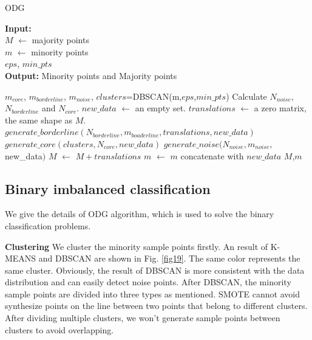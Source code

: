 \documentclass[ida]{iosart2x}
\begin{document}
  \begin{algorithm}[tbp]
    \caption{ODG} %
    \label{alg1}
    \hspace*{0.02in} {\bf Input:}
     \\$M$ $\leftarrow$ majority points  \\
     $m$ $\leftarrow$ minority points  \\
     $eps$, $min\_pts$\\
    \hspace*{0.02in} {\bf Output:} %
    Minority points and Majority points
    \begin{algorithmic}[1]
    \State $m_{core}$, $m_{borderline}$, $m_{noise}$, $clusters$=DBSCAN(m,$eps$,$min\_pts$) %
    \State Calculate $N_{noise}$, $N_{borderline}$ and $N_{core}$.
    \State $new\_data$ $\leftarrow$ an empty set.
    \State $translations$ $\leftarrow$ a zero matrix, the same shape as $M$.
    \State $generate\_borderline(N_{borderline},m_{boaderline},translations, new\_data)$
    \State $generate\_core(clusters,N_{core},new\_data)$
    \State $generate\_noise(N_{noise},m_{noise},$new\_data$)$
    \State $M$ $\leftarrow$ $M+translations$
    \State $m$ $\leftarrow$ $m$ concatenate with $new\_data$
    \State \Return $M$,$m$
    \end{algorithmic}
    \end{algorithm}

\subsection{Binary imbalanced classification}
We give the details of ODG algorithm, which is used to solve the binary classification problems.

\textbf{Clustering} We cluster the minority sample points firstly.
An result of K-MEANS and DBSCAN are shown in Fig. \ref{fig19}.
The same color represents the same cluster.
Obviously, the result of DBSCAN is more 
consistent with the data distribution and can easily detect noise points.
After DBSCAN, 
the minority sample points are divided into three types as mentioned.
SMOTE cannot avoid synthesize points on the line between 
two points that belong to different clusters.
After dividing multiple clusters, 
we won't generate sample points between clusters to avoid overlapping.
\end{document}
